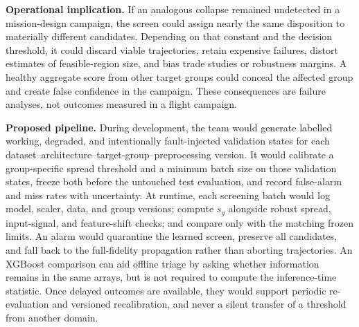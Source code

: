 \documentclass[preprint,12pt,authoryear,doubleblind]{elsarticle}
\begin{document}
\textbf{Operational implication.} If an analogous collapse remained undetected in a mission-design campaign, the screen could assign nearly the same disposition to materially different candidates. Depending on that constant and the decision threshold, it could discard viable trajectories, retain expensive failures, distort estimates of feasible-region size, and bias trade studies or robustness margins. A healthy aggregate score from other target groups could conceal the affected group and create false confidence in the campaign. These consequences are failure analyses, not outcomes measured in a flight campaign.

\textbf{Proposed pipeline.} During development, the team would generate labelled working, degraded, and intentionally fault-injected validation states for each dataset--architecture--target-group--preprocessing version. It would calibrate a group-specific spread threshold and a minimum batch size on those validation states, freeze both before the untouched test evaluation, and record false-alarm and miss rates with uncertainty. At runtime, each screening batch would log model, scaler, data, and group versions; compute $s_g$ alongside robust spread, input-signal, and feature-shift checks; and compare only with the matching frozen limits. An alarm would quarantine the learned screen, preserve all candidates, and fall back to the full-fidelity propagation rather than aborting trajectories. An XGBoost comparison can aid offline triage by asking whether information remains in the same arrays, but is not required to compute the inference-time statistic. Once delayed outcomes are available, they would support periodic re-evaluation and versioned recalibration, and never a silent transfer of a threshold from another domain.
\end{document}
